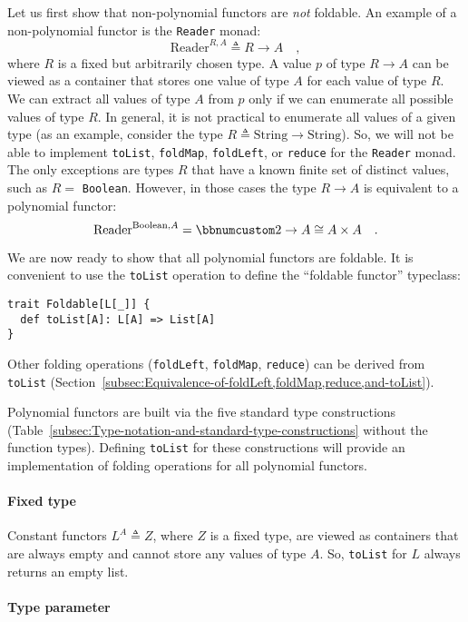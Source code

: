 Let us first show that non-polynomial functors are \emph{not} foldable.
An example of a non-polynomial functor is the \lstinline!Reader!
monad:
\[
\text{Reader}^{R,A}\triangleq R\rightarrow A\quad,
\]
where $R$ is a fixed but arbitrarily chosen type. A value $p$ of
type $R\rightarrow A$ can be viewed as a container that stores one
value of type $A$ for each value of type $R$. We can extract all
values of type $A$ from $p$ only if we can enumerate all possible
values of type $R$. In general, it is not practical to enumerate
all values of a given type (as an example, consider the type $R\triangleq\text{String}\rightarrow\text{String}$).
So, we will not be able to implement \lstinline!toList!, \lstinline!foldMap!,
\lstinline!foldLeft!, or \lstinline!reduce! for the \lstinline!Reader!
monad. The only exceptions are types $R$ that have a known finite
set of distinct values, such as $R=$ \lstinline!Boolean!. However,
in those cases the type $R\rightarrow A$ is equivalent to a polynomial
functor:
\[
\text{Reader}^{\text{Boolean},A}=\bbnum 2\rightarrow A\cong A\times A\quad.
\]

We are now ready to show that all polynomial functors are foldable.
It is convenient to use the \lstinline!toList! operation to define
the \textsf{``}foldable functor\textsf{''} typeclass:
\begin{lstlisting}
trait Foldable[L[_]] {
  def toList[A]: L[A] => List[A]
}
\end{lstlisting}
Other folding operations (\lstinline!foldLeft!, \lstinline!foldMap!,
\lstinline!reduce!) can be derived from \lstinline!toList! (Section~\ref{subsec:Equivalence-of-foldLeft,foldMap,reduce,and-toList}).

Polynomial functors are built via the five standard type constructions
(Table~\ref{subsec:Type-notation-and-standard-type-constructions}
without the function types). Defining \lstinline!toList! for these
constructions will provide an implementation of folding operations
for all polynomial functors.

\paragraph{Fixed type}

Constant functors $L^{A}\triangleq Z$, where $Z$ is a fixed type,
are viewed as containers that are always empty and cannot store any
values of type $A$. So, \lstinline!toList! for $L$ always returns
an empty list.

\paragraph{Type parameter}

